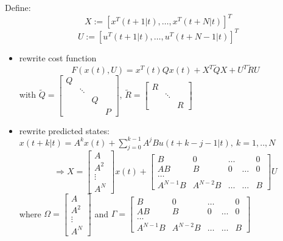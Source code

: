 Define: 
\begin{equation}
X:= [x^T(t+1|t), \dots, x^T(t+N|t)]^T
\end{equation}
\begin{equation}
U:= [u^T(t+1|t), \dots, u^T(t+N-1|t)]^T
\end{equation}
\begin{itemize}
	\item rewrite cost function
	\begin{equation}\label{cost_function}
	F(x(t),U) = x^T(t)Qx(t) + X^T\tilde{Q}X + U^T\tilde{R}U
	\end{equation}
	with $\tilde{Q} = 
	\begin{bmatrix}
    Q  & \  & \ \\
    \  &\ddots & \\
     \  & \ & Q \\
     \ & \ & \ & P     
	\end{bmatrix} $, 
	$\tilde{R} = 
	\begin{bmatrix}
    R  & \  & \ \\
    \  &\ddots & \\
     \  & \ & R     
	\end{bmatrix} $
	\item rewrite predicted states: $x(t+k|t) = A^kx(t) + 		\sum_{j=0}^{k-1}A^jBu(t+k-j-1|t), \ k=1,..,N$
	\begin{equation}\label{rewritten_state_input}
\Rightarrow X=\begin{bmatrix}
   A \\
   A^2 \\
   \vdots \\
   A^N   
\end{bmatrix}x(t) +\begin{bmatrix}
    B  & 0 & \dots &  & 0 \\
    AB & B & 0 & \dots & 0\\
    \hdots & & & & \\
    A^{N-1}B  & A^{N-2}B & \dots & \dots & B     
\end{bmatrix}U
\end{equation}
where $\Omega = \begin{bmatrix}
   A \\
   A^2 \\
   \vdots \\
   A^N   
\end{bmatrix}$ and $\Gamma = \begin{bmatrix}
    B  & 0 & \dots &  & 0 \\
    AB & B & 0 & \dots & 0\\
    \hdots & & & & \\
    A^{N-1}B  & A^{N-2}B & \dots & \dots & B     
\end{bmatrix}$


\end{itemize}
